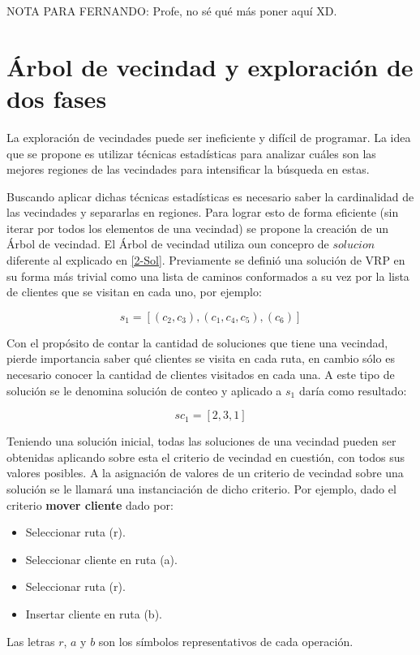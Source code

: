 NOTA PARA FERNANDO: Profe, no sé qué más poner aquí XD.

\section{Árbol de vecindad y exploración de dos fases}\label{2-Hector}
La exploración de vecindades puede ser ineficiente y difícil de programar. La idea que se propone es utilizar técnicas estadísticas para analizar cuáles son las mejores regiones de las vecindades para intensificar la búsqueda en estas.

Buscando aplicar dichas técnicas estadísticas es necesario saber la cardinalidad de las vecindades y separarlas en regiones. Para lograr esto de forma eficiente (sin iterar por todos los elementos de una vecindad) se propone la creación de un Árbol de vecindad. El Árbol de vecindad utiliza oun concepro de $solucion$ diferente al explicado en \ref{2-Sol}. Previamente se definió una solución de VRP en su forma más trivial como una lista de caminos conformados a su vez por la lista de clientes que se visitan en cada uno, por ejemplo:

\begin{equation}
s_1 = [(c_2,c_3), (c_1,c_4,c_5), (c_6)]
\end{equation}

Con el propósito de contar la cantidad de soluciones que tiene una vecindad, pierde importancia saber qué clientes se visita en cada ruta, en cambio sólo es necesario conocer la cantidad de clientes visitados en cada una. A este tipo de solución se le denomina solución de conteo y aplicado a $s_1$ daría como resultado:

\begin{equation}
sc_1 = [2, 3, 1]
\end{equation}

Teniendo una solución inicial, todas las soluciones de una vecindad pueden ser obtenidas aplicando sobre esta el criterio de vecindad en cuestión, con todos sus valores posibles. A la asignación de valores de un criterio de vecindad sobre una solución se le llamará una instanciación de dicho criterio. Por ejemplo, dado el criterio \textbf{mover cliente} dado por: 

\begin{itemize}
	\item Seleccionar ruta (r).
	\item Seleccionar cliente en ruta (a).
	\item Seleccionar ruta (r).
	\item Insertar cliente en ruta (b).
\end{itemize}
Las letras $r$, $a$ y $b$ son los símbolos representativos de cada operación.

